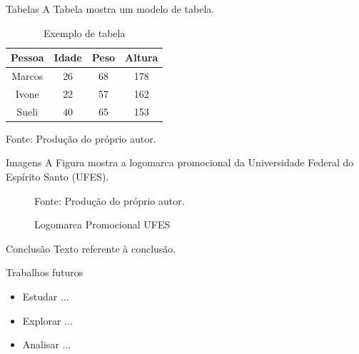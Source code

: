 \documentclass[11pt]{beamer}
\begin{document}
	\begin{frame}{Tabelas}
		A Tabela mostra um modelo de tabela.
		
		\begin{table}[htb]
			\caption{Exemplo de tabela}
			\label{tab:modelo_tabela}
			\centering
			\begin{tabular}{c|c|c|c}
				\hline
				\textbf{Pessoa} & \textbf{Idade} & \textbf{Peso} & \textbf{Altura} \\ \hline
				Marcos & 26    & 68   & 178    \\ \hline
				Ivone  & 22    & 57   & 162    \\ \hline
				Sueli  & 40    & 65   & 153    \\ \hline
			\end{tabular}
			
			\medskip
			
			Fonte: Produção do próprio autor.
		\end{table}
	\end{frame}
	
	\begin{frame}{Imagens}
		A Figura mostra a logomarca promocional da Universidade Federal do Espírito Santo (UFES).
		
		\begin{figure}[htb]
			\caption{Logomarca Promocional UFES}
			\label{fig:logo_UFES}
			\centering
			
			\medskip
			
			Fonte: Produção do próprio autor.
		\end{figure}
	\end{frame}
	
	\begin{frame}{Conclusão}
		Texto referente à conclusão.
	\end{frame}
	
	\begin{frame}{Trabalhos futuros}
		\begin{itemize}
			\item Estudar $\ldots$
			
			\medskip
			
			\item Explorar $\ldots$
			
			\medskip
			
			\item Analisar $\ldots$
		\end{itemize}
	\end{frame}
	
\end{document}
